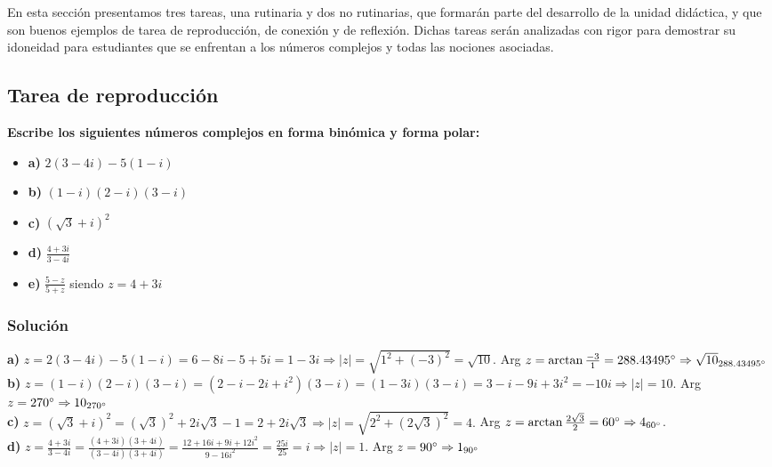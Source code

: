 \documentclass[../main.tex]{memoir}
\begin{document}
En esta sección presentamos tres tareas, una rutinaria y dos no rutinarias, que formarán parte del desarrollo de la unidad didáctica, y que son buenos ejemplos de tarea de reproducción, de conexión y de reflexión. Dichas tareas serán analizadas con rigor para demostrar su idoneidad para estudiantes que se enfrentan a los números complejos y todas las nociones asociadas.

\subsection{Tarea de reproducción}

\textbf{Escribe los siguientes números complejos en forma binómica y forma polar:}

\begin{itemize}
	\item \textbf{a)} $2(3-4i)-5(1-i)$
	\item \textbf{b)} $(1-i)(2-i)(3-i)$
	\item \textbf{c)} $(\sqrt{3}+i)^2$
	\item \textbf{d)} $\frac{4+3i}{3-4i}$
	\item \textbf{e)} $\frac{5-z}{5+z}$ siendo $z=4+3i$
\end{itemize}

\subsubsection{Solución}

\textbf{a)} $z =2(3-4i)-5(1-i) = 6-8i-5+5i = 1-3i \Rightarrow |z| = \sqrt{1^2+(-3)^2} = \sqrt{10}.$ Arg $z = \arctan \frac{-3}{1} = 288.43495\degree \Rightarrow \sqrt{10}_{288.43495\degree}$ \\

\textbf{b)} $z = (1-i)(2-i)(3-i)=(2-i-2i+i^2)(3-i)=(1-3i)(3-i)=3-i-9i+3i^2 = -10i \Rightarrow |z| = 10.$ Arg $z = 270\degree \Rightarrow 10_{270\degree}$ \\

\textbf{c)} $z = (\sqrt{3}+i)^2 = (\sqrt{3})^2 +2i \sqrt{3}-1 = 2 + 2i\sqrt{3} \Rightarrow |z| = \sqrt{2^2 + (2\sqrt{3})^2}=4.$ Arg $z = \arctan \frac{2\sqrt{3}}{2} =60\degree \Rightarrow 4_{60\degree}$. \\

\textbf{d)} $z = \frac{4+3i}{3-4i} = \frac{(4+3i)(3+4i)}{(3-4i)(3+4i)}= \frac{12+16i+9i+12i^2}{9-16i^2}= \frac{25i}{25} = i \Rightarrow |z| = 1.$ Arg $z = 90\degree \Rightarrow 1_{90\degree}$ \\
\end{document}
